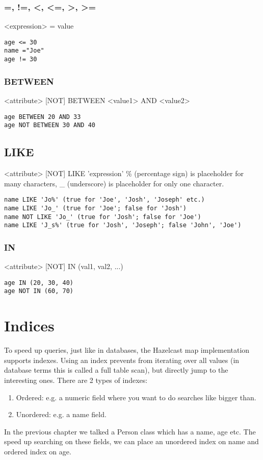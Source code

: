 \subsubsection*{=, !=, <, <=, >, >=}
<expression> = value
\begin{lstlisting}
age <= 30
name ="Joe"
age != 30
\end{lstlisting}

\subsubsection*{BETWEEN}
<attribute> [NOT] BETWEEN <value1> AND <value2>
\begin{lstlisting}
age BETWEEN 20 AND 33
age NOT BETWEEN 30 AND 40
\end{lstlisting}

\subsection{LIKE}
<attribute> [NOT] LIKE 'expression'
\% (percentage sign) is placeholder for many characters, \_ (underscore) is placeholder for only one character.
\begin{lstlisting}
name LIKE 'Jo%' (true for 'Joe', 'Josh', 'Joseph' etc.)
name LIKE 'Jo_' (true for 'Joe'; false for 'Josh')
name NOT LIKE 'Jo_' (true for 'Josh'; false for 'Joe')
name LIKE 'J_s%' (true for 'Josh', 'Joseph'; false 'John', 'Joe')
\end{lstlisting}

\subsubsection{IN}
<attribute> [NOT] IN (val1, val2, ...)
\begin{lstlisting}
age IN (20, 30, 40)
age NOT IN (60, 70)
\end{lstlisting}

\section{Indices}
To speed up queries, just like in databases, the Hazelcast map implementation supports indexes. Using an index prevents from iterating over all values (in database terms this is called a full table scan), but directly jump to the interesting ones. There are 2 types of indexes:
\begin{enumerate}
\item Ordered: e.g. a numeric field where you want to do searches like bigger than.
\item Unordered: e.g. a name field.
\end{enumerate}
In the previous chapter we talked a Person class which has a name, age etc. The speed up searching on these fields, we can place an unordered index on name and ordered index on age. 

